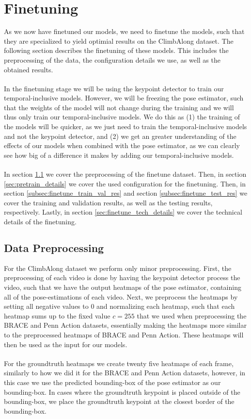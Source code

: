 \documentclass[./main.tex]{subfiles}
\begin{document}
\section{Finetuning}
\label{sec:finetuning}
As we now have finetuned our models, we need to finetune the models, such that they are specialized to yield optimial results on the ClimbAlong dataset. The following section describes the finetuning of these models. This includes the preprocessing of the data, the configuration details we use, as well as the obtained results.
\\
\\
In the finetuning stage we will be using the keypoint detector to train our temporal-inclusive models. However, we will be freezing the pose estimator, such that the weights of the model will not change during the training and we will thus only train our temporal-inclusive models. We do this as (1) the training of the models will be quicker, as we just need to train the temporal-inclusive models and not the keypoint detector, and (2) we get an greater understanding of the effects of our models when combined with the pose estimator, as we can clearly see how big of a difference it makes by adding our temporal-inclusive models.
\\
\\
In section \ref{sec:finetune_data_preprocessing} we cover the preprocessing of the finetune dataset. Then, in section \ref{sec:pretrain_details} we cover the used configuration for the finetuning. Then, in section \ref{subsec:finetune_train_val_res} and section \ref{subsec:finetune_test_res} we cover the training and validation results, as well as the testing results, respectively. Lastly, in section \ref{sec:finetune_tech_details} we cover the technical details of the finetuning.

\subsection{Data Preprocessing}
\label{sec:finetune_data_preprocessing}
For the ClimbAlong dataset we perform only minor preprocessing. First, the preprocessing of each video is done by having the keypoint detector process the video, such that we have the output heatmaps of the pose estimator, containing all of the pose-estimations of each video. Next, we preprocess the heatmaps by setting all negative values to $0$ and normalizing each heatmap, such that each heatmap sums up to the fixed value $c = 255$ that we used when preprocessing the BRACE and Penn Action datasets, essentially making the heatmaps more similar to the preprocessed heatmaps of BRACE and Penn Action. These heatmaps will then be used as the input for our models.
\\
\\
For the groundtruth heatmaps we create twenty five heatmaps of each frame, similarly to how we did it for the BRACE and Penn Action datasets, however, in this case we use the predicted bounding-box of the pose estimator as our bounding-box. In cases where the groundtruth keypoint is placed outside of the bounding-box, we place the groundtruth keypoint at the closest border of the bounding-box.
\end{document}
